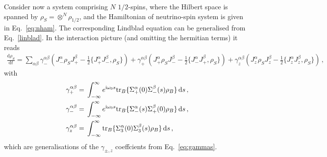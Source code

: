 \documentclass[aps,prd,10pt,twocolumn,superscriptaddress,floatfix,nofootinbib,amsmath,amssymb,altaffilletter,preprintnumbers]{revtex4-1}
\begin{document}
Consider now a system comprising $N$ $1/2$-spins, where the Hilbert space is spanned by $\rho_S=\otimes^N\rho_{1/2}$, and the Hamiltonian of neutrino-spin system is given in Eq.~\eqref{eq:nham}.
The corresponding Lindblad equation can be generalised from Eq.~\eqref{linblad}. In the interaction picture (and omitting the hermitian terms) it reads 
\begin{equation}
\begin{aligned}
\frac{\mathrm{d} \rho_S}{\mathrm{d}t} =\sum_{\alpha \beta}\gamma^{\alpha \beta}_{-}(J^\alpha_- \rho_S J^\beta_+ - \frac{1}{2} \{J^\alpha_+ J^\beta_-,\rho_S\} )
 + \gamma^{\alpha \beta}_{+}(J^\alpha_+ \rho_S J^\beta_- - \frac{1}{2} \{J^\alpha_- J^\beta_+,\rho_S\} ) + \gamma^{\alpha \beta}_{z}(J^\alpha_z \rho_S J^\beta_z - \frac{1}{2} \{J^\alpha_z J^\beta_z,\rho_S\} ) \, ,
\end{aligned}
\end{equation}
with
\begin{equation}
\begin{aligned}
\gamma^{\alpha \beta}_{+}= &\; \int_{-\infty}^{\infty}e^{{\rm i}\omega_0 s}\text{tr}_B\{\Sigma^\alpha_+(0)\Sigma^\beta_-(s)\rho_B\}\, {\rm d} s \, ,\\
\gamma^{\alpha \beta}_{-}=&\; \int_{-\infty}^{\infty}e^{{\rm i}\omega_0 s}\text{tr}_B\{\Sigma^\alpha_-(s)\Sigma^\beta_+(0)\rho_B\}\, {\rm d}s\, , \\
\gamma^{\alpha \beta}_{z}=&\; \int_{-\infty}^{\infty}\text{tr}_B\{\Sigma^\alpha_3(0)\Sigma^\beta_3(s)\rho_B\}\, {\rm d}s\,,
\end{aligned}
\end{equation}
which are generalisations of the $\gamma_{\pm,z}$ coeffcients from Eq.~\eqref{eq:gammas}.
\end{document}
